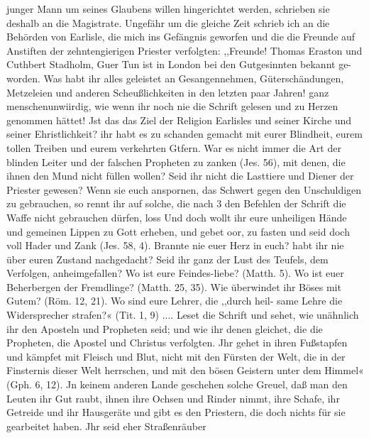 
junger Mann um seines Glaubens willen hingerichtet werden,
schrieben sie deshalb an die Magistrate.
Ungefähr um die gleiche Zeit schrieb ich an die Behörden
von Earlisle, die mich ins Gefängnis geworfen und die die
Freunde auf Anstiften der zehntengierigen Priester verfolgten:
,,Freunde! Thomas Eraston und Cuthbert Stadholm,
Guer Tun ist in London bei den Gutgesinnten bekannt ge-
worden. Was habt ihr alles geleistet an Gesangennehmen,
Güterschändungen, Metzeleien und anderen Scheußlichkeiten in den
letzten paar Jahren! ganz menschenunwiirdig, wie wenn ihr
noch nie die Schrift gelesen und zu Herzen genommen hättet!
Jst das das Ziel der Religion Earlisles und seiner Kirche und
seiner Ehristlichkeit? ihr habt es zu schanden gemacht mit eurer
Blindheit, eurem tollen Treiben und eurem verkehrten Gtfern.
War es nicht immer die Art der blinden Leiter und der falschen
Propheten zu zanken (Jes. 56), mit denen, die ihnen den Mund
nicht füllen wollen? Seid ihr nicht die Lasttiere und Diener der
Priester gewesen? Wenn sie euch anspornen, das Schwert gegen
den Unschuldigen zu gebrauchen, so rennt ihr auf solche, die nach 3
den Befehlen der Schrift die Waffe nicht gebrauchen dürfen, loss
Und doch wollt ihr eure unheiligen Hände und gemeinen Lippen
zu Gott erheben, und gebet oor, zu fasten und seid doch voll
Hader und Zank (Jes. 58, 4). Brannte nie euer Herz in euch?
habt ihr nie über euren Zustand nachgedacht? Seid ihr ganz
der Lust des Teufels, dem Verfolgen, anheimgefallen? Wo ist
eure Feindes-liebe? (Matth. 5). Wo ist euer Beherbergen der
Fremdlinge? (Matth. 25, 35). Wie überwindet ihr Böses mit
Gutem? (Röm. 12, 21). Wo sind eure Lehrer, die ,,durch heil-
same Lehre die Widersprecher strafen?« (Tit. 1, 9) .... Leset die
Schrift und sehet, wie unähnlich ihr den Aposteln und Propheten
seid; und wie ihr denen gleichet, die die Propheten, die Apostel
und Christus verfolgten. Jhr gehet in ihren Fußstapfen und
kämpfet mit Fleisch und Blut, nicht mit den Fürsten der Welt,
die in der Finsternis dieser Welt herrschen, und mit den bösen
Geistern unter dem Himmel« (Gph. 6, 12). Jn keinem anderen
Lande geschehen solche Greuel, daß man den Leuten ihr Gut
raubt, ihnen ihre Ochsen und Rinder nimmt, ihre Schafe, ihr
Getreide und ihr Hausgeräte und gibt es den Priestern, die doch
nichts für sie gearbeitet haben. Jhr seid eher Straßenräuber


